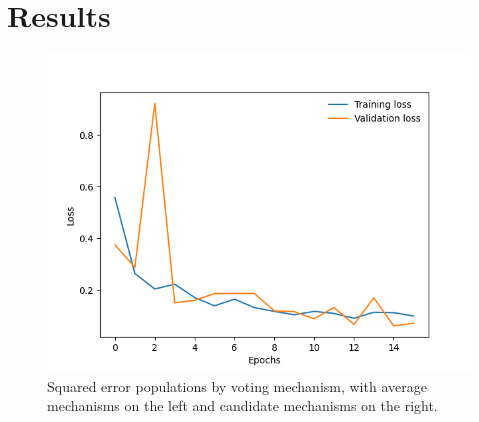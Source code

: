 \section{Results}

\begin{figure}[htbp]
    \centering
    \includegraphics[scale=0.75]
    {./figures/mobile_model_apple_trees_16its_2022-11-15_training_curve}
    \caption{Squared error populations by voting mechanism, with average
    mechanisms on the left and candidate mechanisms on the right.}
    \label{fig:voting-mechanisms-comparison}
\end{figure}
